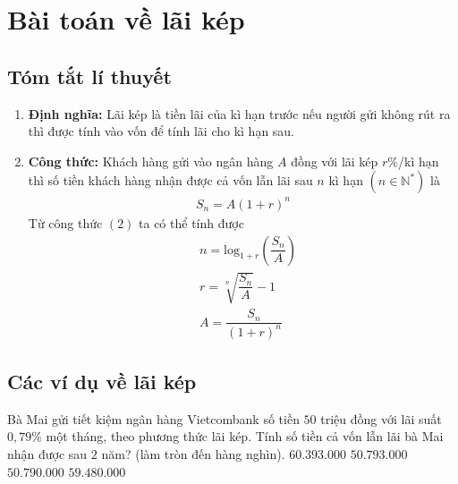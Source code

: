 \section{Bài toán về lãi kép}
\subsection{Tóm tắt lí thuyết}
\begin{enumerate}[1)]
	\item \textbf{Định nghĩa:} Lãi kép là tiền lãi của kì hạn trước nếu người gửi không rút ra thì được tính vào vốn để tính lãi cho kì hạn sau.
	\item \textbf{Công thức:} Khách hàng gửi vào ngân hàng $A$ đồng với lãi kép $r\%$/kì hạn thì số tiền khách hàng nhận được cả vốn lẫn lãi sau $n$ kì hạn $(n\in \mathbb{N}^*)$ là
	\begin{eqnarray}
	\boxed{S_n=A(1+r)^n}
	\end{eqnarray}
	Từ công thức $(2)$ ta có thể tính được
	\begin{eqnarray}
	&\boxed{n=\mathrm{log}_{1+r}\left(\dfrac{S_n}{A}\right)}\\
	&\boxed{r=\sqrt[n]{\dfrac{S_n}{A}}-1}\\
	&\boxed{A=\dfrac{S_n}{(1+r)^n}}
	\end{eqnarray}
\end{enumerate}
\subsection{Các ví dụ về lãi kép}
\begin{vd}%
	Bà Mai gửi tiết kiệm ngân hàng Vietcombank số tiền $50$ triệu đồng với lãi suất $0,79\% $ một tháng, theo phương thức lãi kép. Tính số tiền cả vốn lẫn lãi bà Mai nhận được sau $2$ năm? (làm tròn đến hàng nghìn).\newline
	\choice
	{\True $60.393.000$}
	{$50.793.000$}
	{$50.790.000$}
	{$59.480.000$}
\end{vd}


